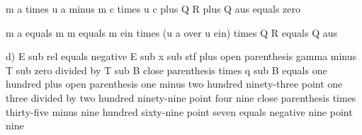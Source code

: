 m a times u a minus m c times u c plus Q R plus Q aus equals zero

m a equals m m equals m ein times (u a over u ein) times Q R equals Q aus

d) E sub rel equals negative E sub x sub stf plus open parenthesis gamma minus T sub zero divided by T sub B close parenthesis times q sub B equals one hundred plus open parenthesis one minus two hundred ninety-three point one three divided by two hundred ninety-nine point four nine close parenthesis times thirty-five minus nine hundred sixty-nine point seven equals negative nine point nine